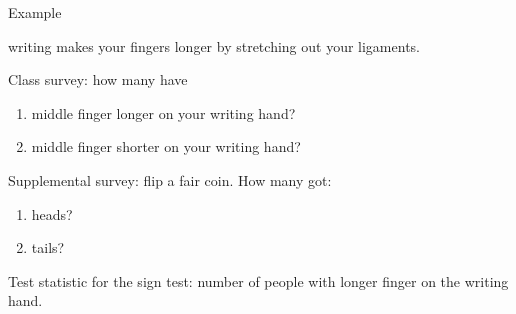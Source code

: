 \begin{frame}{Example}

   writing makes your fingers longer by stretching out your ligaments.

    \vspace{2em}
  
  Class survey: how many have
  \begin{enumerate}
    \item middle finger longer on your writing hand?
    \item middle finger shorter on your writing hand?
  \end{enumerate}

    \vspace{2em}

    Supplemental survey: flip a fair coin.  How many got:
  \begin{enumerate}
    \item heads?
    \item tails?
  \end{enumerate}

    \vspace{2em}

    \alert{Test statistic} for the sign test: number of people with longer finger on the writing hand.

\end{frame}


